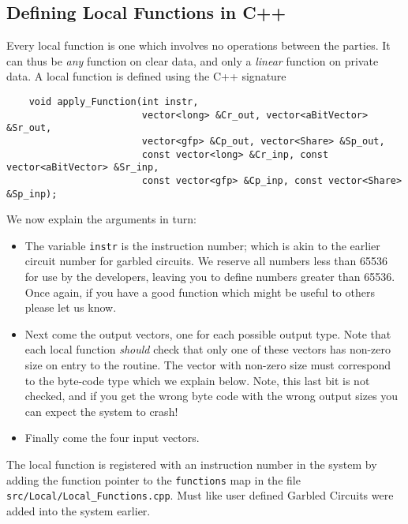 \subsection{Defining Local Functions in C++}
Every local function is one which involves no operations
between the parties.
It can thus be {\em any} function on clear data, and
only a {\em linear} function on private data.
A local function is defined using the C++ signature
\begin{lstlisting}
    void apply_Function(int instr,
                        vector<long> &Cr_out, vector<aBitVector> &Sr_out,
                        vector<gfp> &Cp_out, vector<Share> &Sp_out,
                        const vector<long> &Cr_inp, const vector<aBitVector> &Sr_inp,
                        const vector<gfp> &Cp_inp, const vector<Share> &Sp_inp);
\end{lstlisting}
We now explain the arguments in turn:
\begin{itemize}
\item
The variable \verb|instr| is the instruction number; which is akin to the
earlier circuit number for garbled circuits.
We reserve all numbers less than 65536 for use by the developers, leaving
you to define numbers greater than 65536.
Once again, if you have a good function which might be useful to others
please let us know.
\item
Next come the output vectors, one for each possible output type.
Note that each local function {\em should} check that only one of these 
vectors has non-zero size on entry to the routine. The vector with non-zero size must
correspond to the byte-code type which we explain below.
Note, this last bit is not checked, and if you get the wrong byte
code with the wrong output sizes you can expect the system to crash!
\item Finally come the four input vectors.
\end{itemize}
The local function is registered with an instruction number in the
system by adding the function pointer to the \verb|functions| map
in the file \verb|src/Local/Local_Functions.cpp|.
Must like user defined Garbled Circuits were added into the
system earlier.

